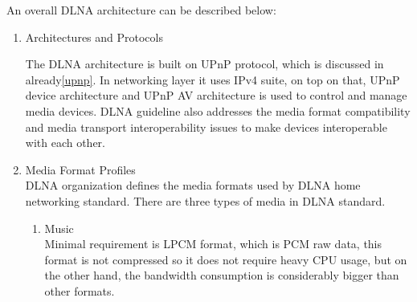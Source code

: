 An overall DLNA architecture can be described below:
\begin{enumerate}
\item Architectures and Protocols

\begin{table}[htb]
\caption{Key Technology Ingredients \label{Table3}}
\begin{center}
\end{center}
\end{table}

The DLNA architecture is built on UPnP protocol, which is discussed in
already\ref{upnp}.
In networking layer it uses IPv4 suite, on top on that, UPnP device architecture
and UPnP AV architecture is used to control and manage media devices. DLNA
guideline also addresses the media format compatibility and media transport
interoperability issues to make devices interoperable with each other.

\item Media Format Profiles \\
DLNA organization defines the media formats used by DLNA home networking standard. There are 
three types of media in DLNA standard.
\begin{enumerate}
\item Music \\
Minimal requirement is LPCM format, which is PCM raw data, this format is not compressed so 
it does not require heavy CPU usage, but on the other hand, the bandwidth consumption is 
considerably bigger than other formats.


\end{enumerate}
\end{enumerate}
